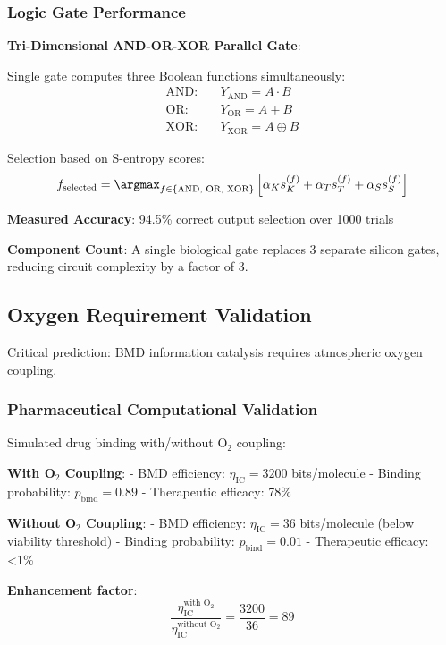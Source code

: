 \documentclass[11pt,onecolumn]{article}
\begin{document}
\subsubsection{Logic Gate Performance}

\textbf{Tri-Dimensional AND-OR-XOR Parallel Gate}:

Single gate computes three Boolean functions simultaneously:
\begin{align}
\text{AND}: \quad & Y_{\text{AND}} = A \cdot B \\
\text{OR}: \quad & Y_{\text{OR}} = A + B \\
\text{XOR}: \quad & Y_{\text{XOR}} = A \oplus B
\end{align}

Selection based on S-entropy scores:
\begin{equation}
f_{\text{selected}} = \argmax_{f \in \{\text{AND, OR, XOR}\}} \left[\alpha_K s_K^{(f)} + \alpha_T s_T^{(f)} + \alpha_S s_S^{(f)}\right]
\end{equation}

\textbf{Measured Accuracy}: 94.5\% correct output selection over 1000 trials

\textbf{Component Count}: A single biological gate replaces 3 separate silicon gates, reducing circuit complexity by a factor of 3.

\subsection{Oxygen Requirement Validation}

Critical prediction: BMD information catalysis requires atmospheric oxygen coupling.

\subsubsection{Pharmaceutical Computational Validation}

Simulated drug binding with/without O$_2$ coupling:

\textbf{With O$_2$ Coupling}:
- BMD efficiency: $\eta_{\text{IC}} = 3200$ bits/molecule
- Binding probability: $p_{\text{bind}} = 0.89$
- Therapeutic efficacy: 78\%

\textbf{Without O$_2$ Coupling}:
- BMD efficiency: $\eta_{\text{IC}} = 36$ bits/molecule (below viability threshold)
- Binding probability: $p_{\text{bind}} = 0.01$ 
- Therapeutic efficacy: <1\%

\textbf{Enhancement factor}:
\begin{equation}
\frac{\eta_{\text{IC}}^{\text{with O}_2}}{\eta_{\text{IC}}^{\text{without O}_2}} = \frac{3200}{36} = 89
\end{equation}
\end{document}
